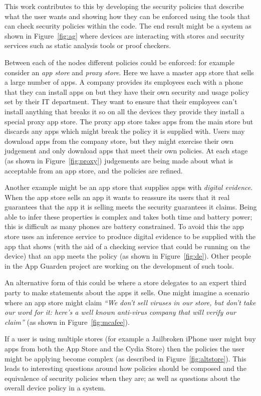 \documentclass[a4paper,sfsidenotes]{tufte-book}
\begin{document}
This work contributes to this by developing the security policies that describe
what the user wants and showing how they can be enforced using the tools that
can check security policies within the code.  The end result might be a system
as shown in Figure~\ref{fig:ag} where devices are interacting with stores and
security services such as static analysis tools or proof checkers. 

Between each of the nodes different policies could be enforced: for example
consider an \emph{app store} and \emph{proxy store}.  Here we have a master app
store that sells a large number of apps.  A company provides its employees each
with a phone that they can install apps on but they have their own security
and usage policy set by their IT department.  They want to ensure that their
employees can't install anything that breaks it so on all the devices they
provide they install a special proxy app store.  The proxy app store takes apps
from the main store but discards any apps which might break the policy it is
supplied with.  Users may download apps from the company store, but they might
exercise their own judgement and only download apps that meet their own
policies.  At each stage (as shown in Figure~\ref{fig:proxy})
judgements are being made about what is acceptable from an app store, and the
policies are refined.

Another example might be an app store that supplies apps with \emph{digital
evidence}.  When the app store sells an app it wants to reassure its users that
it real guarantees that the app it is selling meets the security guarantees it
claims.  Being able to infer these properties is complex and takes both time and
battery power; this is difficult as many phones are battery constrained.  To
avoid this the app store uses an inference service to produce digital evidence
to be supplied with the app that shows (with the aid of a checking service that
could be running on the device) that an app meets the policy (as shown in
Figure~\ref{fig:de}). Other people in the App Guarden project are working on the
development of such tools.

An alternative form of this could be where a store delegates to an expert third
party to make statements about the apps it sells.  One might imagine a scenario
where an app store might claim \emph{``We don't sell viruses in our store, but
don't take our word for it: here's a well known anti-virus company that will
verify our claim''} (as shown in Figure~\ref{fig:mcafee}).

If a user is using multiple stores (for example a Jailbroken iPhone user might
buy apps from both the App Store and the Cydia Store) then the policies the user
might be applying become complex (as described in Figure~\ref{fig:altstore}).
This leads to interesting questions around how policies should be composed and
the equivalence of security policies when they are; as well as questions about
the overall device policy in a system.
\end{document}

